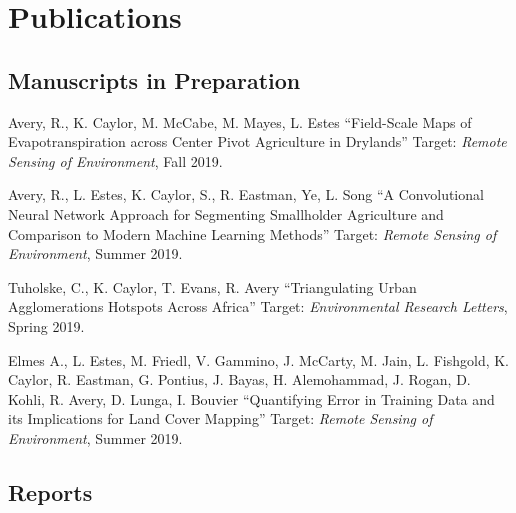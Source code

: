 \documentclass[12pt,letterpaper]{report}
\begin{document}
	
	
    \section*{Publications}
	
    \subsection*{Manuscripts in Preparation}

    \begin{tablist}

        \item[\the\year] \tab Avery, R., K. Caylor, M. McCabe, M. Mayes, L. Estes \enquote{Field-Scale Maps of Evapotranspiration across Center Pivot Agriculture in Drylands} Target: \textit{Remote Sensing of Environment}, Fall 2019.

        \item[\the\year] \tab Avery, R., L. Estes, K. Caylor, S., R. Eastman, Ye, L. Song \enquote{A Convolutional Neural Network Approach for Segmenting Smallholder Agriculture and Comparison to Modern Machine Learning Methods} Target: \textit{Remote Sensing of Environment}, Summer 2019.        

        \item[\the\year] \tab Tuholske, C., K. Caylor, T. Evans, R. Avery \enquote{Triangulating Urban Agglomerations Hotspots Across Africa} Target: \textit{Environmental Research Letters}, Spring 2019.

        \item[\the\year] \tab Elmes A., L. Estes, M. Friedl, V. Gammino, J. McCarty, M. Jain, L. Fishgold, K. Caylor, R. Eastman, G. Pontius, J. Bayas, H. Alemohammad, J. Rogan, D. Kohli, R. Avery, D. Lunga, I. Bouvier   \enquote{Quantifying Error in Training Data and its Implications for Land Cover Mapping} Target: \textit{Remote Sensing of Environment}, Summer 2019.
    
    \end{tablist}


    \subsection*{Reports}
\end{document}
